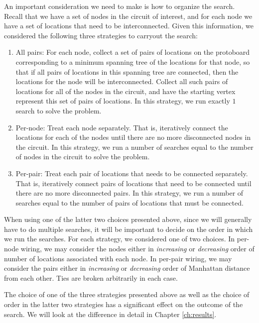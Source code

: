 An important consideration we need to make is how to organize the
search. Recall that we have a set of nodes in the circuit of interest, and for
each node we have a set of locations that need to be interconnected. Given this
information, we considered the following three strategies to carryout the
search:

\begin{enumerate}
\item All pairs: For each node, collect a set of pairs of locations on the
protoboard
corresponding to a minimum spanning tree of the locations for that node, so that
if all pairs of locations in this spanning tree are connected, then the
locations for the node will be interconnected. Collect all such pairs of
locations for all of the nodes in the circuit, and have the starting vertex
represent
this set of pairs of locations. In this strategy, we run exactly $1$ search to
solve the problem.
\item Per-node: Treat each node separately. That is, iteratively connect the
locations for each of the nodes until there are no more disconnected nodes in
the circuit. In this strategy, we run a number of searches equal to the number
of nodes in the circuit to solve the problem.
\item Per-pair: Treat each pair of locations that needs to be connected
separately. That
is, iteratively connect pairs of locations that need to be connected until there
are no more disconnected pairs. In this strategy, we run a number of searches
equal to the number of pairs of locations that must be connected.
\end{enumerate}

When using one of the latter two choices presented above, since we will
generally have to do multiple searches, it will be important to decide on the
order in which we run the searches. For each strategy, we considered one of
two choices. In per-node wiring, we may consider the nodes either in
\emph{increasing} or \emph{decreasing} order of number of locations associated
with each node. In per-pair wiring, we may consider the pairs either in
\emph{increasing} or \emph{decreasing} order of Manhattan distance from
each other. Ties are broken arbitrarily in each case.

The choice of one of the three strategies presented above as well as the choice
of order in the latter two strategies has a significant effect on the outcome of
the search. We will look at the difference in detail in Chapter \ref{ch:results}.

